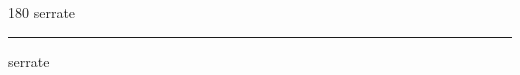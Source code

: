 
\begin{frame}
\begin{center}
\begin{turn}{180}
{\fontsize{2.5cm}{1em}\selectfont serrate}
\end{turn}
\vspace{1em}\par  
\hrule
\vspace{1em}\par  
{\fontsize{2.5cm}{1em}\selectfont serrate}
\end{center}
\end{frame}
